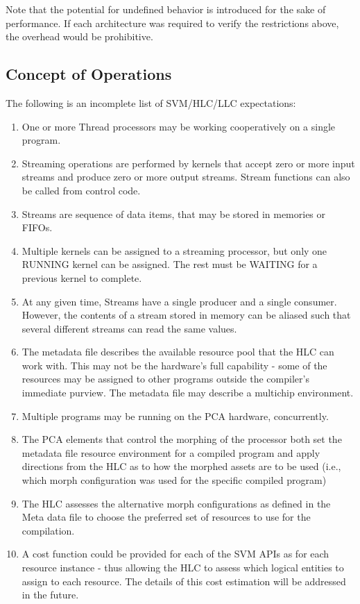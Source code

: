 Note that the potential for undefined behavior is introduced for the
sake of performance.  If each architecture was required to verify the
restrictions above, the overhead would be prohibitive.

\subsection{Concept of Operations}

The following is an incomplete list of SVM/HLC/LLC expectations:

\begin{enumerate}

\item One or more Thread processors may be working cooperatively on a
single program.

\item Streaming operations are performed by kernels that accept zero
or more input streams and produce zero or more output streams.  Stream
functions can also be called from control code.

\item Streams are sequence of data items, that may be stored in
memories or FIFOs.

\item Multiple kernels can be assigned to a streaming processor, but
only one RUNNING kernel can be assigned.  The rest must be WAITING for
a previous kernel to complete.

\item At any given time, Streams have a single producer and a single
consumer.  However, the contents of a stream stored in memory can be
aliased such that several different streams can read the same values.

\item The metadata file describes the available resource pool that the
HLC can work with.  This may not be the hardware's full capability -
some of the resources may be assigned to other programs outside the
compiler's immediate purview.  The metadata file may describe a
multichip environment.

\item Multiple programs may be running on the PCA hardware,
concurrently.

\item The PCA elements that control the morphing of the processor both
set the metadata file resource environment for a compiled program and
apply directions from the HLC as to how the morphed assets are to be
used (i.e., which morph configuration was used for the specific
compiled program)

\item The HLC assesses the alternative morph configurations as defined
in the Meta data file to choose the preferred set of resources to use
for the compilation.

\item A cost function could be provided for each of the SVM APIs as
for each resource instance - thus allowing the HLC to assess which
logical entities to assign to each resource.  The details of this cost
estimation will be addressed in the future.

\end{enumerate}


